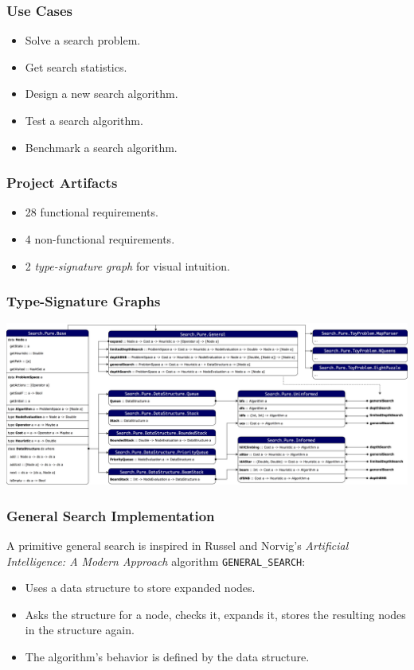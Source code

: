 \documentclass{beamer}
\begin{document}
\begin{frame}
  \frametitle{Use Cases}
  \begin{itemize}
  \item Solve a search problem.
  \item Get search statistics.
  \item Design a new search algorithm.
  \item Test a search algorithm.
  \item Benchmark a search algorithm.
  \end{itemize}
\end{frame}

\begin{frame}
  \frametitle{Project Artifacts}
  \begin{itemize}
  \item 28 functional requirements.
  \item 4 non-functional requirements.
  \item 2 \emph{type-signature graph} for visual intuition.
  \end{itemize}
\end{frame}

\begin{frame}
  \frametitle{Type-Signature Graphs}
  \includegraphics[width=\textwidth]{type-graph-pure.png}
\end{frame}

\begin{frame}
  \frametitle{General Search Implementation}
  A primitive general search is inspired in Russel and Norvig's
  \emph{Artificial Intelligence: A Modern Approach} algorithm
  \texttt{GENERAL\_SEARCH}:
  \begin{itemize}
  \item Uses a data structure to store expanded nodes.
  \item Asks the structure for a node, checks it, expands it, stores the
    resulting nodes in the structure again.
  \item The algorithm's behavior is defined by the data structure.
  \end{itemize}
\end{frame}
\end{document}
